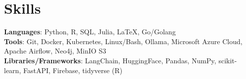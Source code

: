 \documentclass[letterpaper,11pt]{article}
\makeatletter
\newcommand{\resumeItem}[1]{
  \item\small{
    {#1 \vspace{-2pt}}
  }
}
\newcommand{\resumeSubheading}[4]{
  \vspace{-2pt}\item
    \begin{tabular*}{1.0\textwidth}[t]{l@{\extracolsep{\fill}}r}
      \textbf{#1} & \small #2 \\
      \textit{\small#3} & \textit{\small #4} \\
    \end{tabular*}\vspace{-7pt}
}
\newcommand{\resumeSubHeadingListStart}{\begin{itemize}[leftmargin=0.0in, label={}]}
\newcommand{\resumeSubHeadingListEnd}{\end{itemize}}
\newcommand{\resumeItemListStart}{\begin{itemize}}
\newcommand{\resumeItemListEnd}{\end{itemize}\vspace{-5pt}}
\makeatother
\begin{document}

\section{Skills}
  \begin{itemize}[leftmargin=0.15in, label={}]
      \small{\item{
      \textbf{Languages}{: Python, R, SQL, Julia, \LaTeX, Go/Golang} \\
      \textbf{Tools}{: Git, Docker, Kubernetes, Linux/Bash, Ollama, Microsoft Azure Cloud, Apache Airflow, Neo4j, MinIO S3} \\
      \textbf{Libraries/Frameworks}{: LangChain, HuggingFace, Pandas, NumPy, scikit-learn, FastAPI, Firebase, tidyverse (R)}  \\
      }}
  \end{itemize} 

\end{document}
